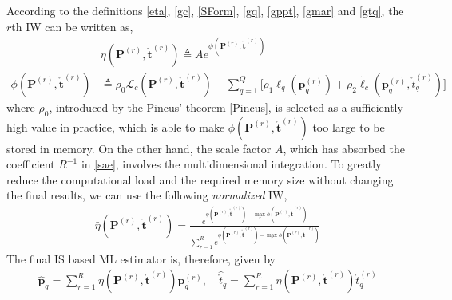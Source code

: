 \documentclass[review]{elsarticle}
\begin{document}
According to the definitions \eqref{eta}, \eqref{gc}, \eqref{SForm}, \eqref{gq}, \eqref{gppt}, \eqref{gmar} and \eqref{gtq}, the $r$th IW can be written as, 
\begin{align}\label{IWw}
    &\eta(\boldsymbol{P}^{(r)},\mathring{\boldsymbol{t}}^{(r)})\triangleq A e^{\phi(\boldsymbol{P}^{(r)},\mathring{\boldsymbol{t}}^{(r)})}\\
    \phi(\boldsymbol{P}^{(r)},\mathring{\boldsymbol{t}}^{(r)}) &\triangleq \rho_0 \mathcal{L}_c(\boldsymbol{P}^{(r)},\mathring{\boldsymbol{t}}^{(r)})-\sum_{q=1}^Q \lbrack\rho_1 \ell_q(\boldsymbol{p}_q^{(r)})+\rho_2\tilde{\ell}_c(\boldsymbol{p}_q^{(r)},\mathring{t}_q^{(r)})\rbrack
\end{align}
where $\rho_0$, introduced by the Pincus' theorem \eqref{Pincus}, is selected as a sufficiently high value in practice, which is able to make $\phi(\boldsymbol{P}^{(r)},\mathring{\boldsymbol{t}}^{(r)})$ too large to be stored in memory. On the other hand, the scale factor $A$, which has absorbed the coefficient $R^{-1}$ in \eqref{sae}, involves the multidimensional integration. To greatly reduce the computational load and the required memory size without changing the final results, we can use the following \emph{normalized} IW,
\begin{align}\label{IWss}
    \bar{\eta}(\boldsymbol{P}^{(r)},\mathring{\boldsymbol{t}}^{(r)})=\frac{e^{\phi(\boldsymbol{P}^{(r)},\mathring{\boldsymbol{t}}^{(r)})-\max _r\phi(\boldsymbol{P}^{(r)},\mathring{\boldsymbol{t}}^{(r)})}}{\sum_{r=1}^R e^{\phi(\boldsymbol{P}^{(r)},\mathring{\boldsymbol{t}}^{(r)})-\max _r\phi(\boldsymbol{P}^{(r)},\mathring{\boldsymbol{t}}^{(r)})}}
\end{align}
The final IS based ML estimator is, therefore, given by
\begin{align}
    \hat{\boldsymbol{p}}_q=\sum_{r=1}^R\bar{\eta}(\boldsymbol{P}^{(r)},\mathring{\boldsymbol{t}}^{(r)}) \boldsymbol{p}_q^{(r)},\quad \hat{\mathring{t}}_q=\sum_{r=1}^R\bar{\eta}(\boldsymbol{P}^{(r)},\mathring{\boldsymbol{t}}^{(r)}) \mathring{t}_q^{(r)}
\end{align}
\end{document}
